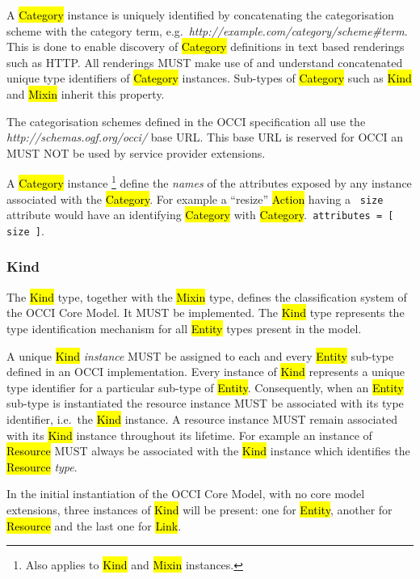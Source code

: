 \documentclass[10pt,a4paper]{article}
\begin{document}
A \hl{Category} instance is uniquely identified by concatenating the
categorisation scheme with the category term,
e.g.~\textit{http://example.com/category/scheme\#term}.
This is done to enable discovery of \hl{Category} definitions in text based
renderings such as HTTP. All renderings MUST make use of and understand
concatenated unique type identifiers of \hl{Category} instances.
%
Sub-types of \hl{Category} such as \hl{Kind} and \hl{Mixin} inherit this property.

The categorisation schemes defined in the OCCI specification all use the
\textit{http://schemas.ogf.org/occi/} base URL. This base URL is reserved for
OCCI an MUST NOT be used by service provider extensions.

A \hl{Category} instance%
\footnote{Also applies to \hl{Kind} and \hl{Mixin} instances.}
define the {\em names} of the attributes exposed by any instance associated
with the \hl{Category}.  For example a ``resize'' \hl{Action} having a {\tt
size} attribute would have an identifying \hl{Category} with \hl{Category}.{\tt
attributes = [ size ]}.

\subsubsection{Kind}
\label{sec:kind}

The \hl{Kind} type, together with the \hl{Mixin} type, defines the
classification system of the OCCI Core Model. It MUST be implemented. The \hl{Kind}
type represents the type identification mechanism for all \hl{Entity} types present in
the model.

A unique \hl{Kind} {\em instance} MUST be assigned to each and every
\hl{Entity} sub-type defined in an OCCI implementation.
%
Every instance of \hl{Kind} represents a unique type identifier for a
particular sub-type of \hl{Entity}.  Consequently, when an \hl{Entity} sub-type
is instantiated the resource instance MUST be associated with its type
identifier, i.e.~the \hl{Kind} instance.  A resource instance MUST remain
associated with its \hl{Kind} instance throughout its lifetime.
%
For example an instance of \hl{Resource} MUST always be associated with the
\hl{Kind} instance which identifies the \hl{Resource} {\em type}.

In the initial instantiation of the OCCI Core Model, with no core model
extensions, three instances of \hl{Kind} will be present: one for \hl{Entity},
another for \hl{Resource} and the last one for \hl{Link}. 
\end{document}
